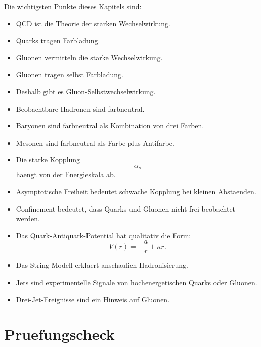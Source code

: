 \begin{notebox}
Die wichtigsten Punkte dieses Kapitels sind:
\begin{itemize}
    \item QCD ist die Theorie der starken Wechselwirkung.
    \item Quarks tragen Farbladung.
    \item Gluonen vermitteln die starke Wechselwirkung.
    \item Gluonen tragen selbst Farbladung.
    \item Deshalb gibt es Gluon-Selbstwechselwirkung.
    \item Beobachtbare Hadronen sind farbneutral.
    \item Baryonen sind farbneutral als Kombination von drei Farben.
    \item Mesonen sind farbneutral als Farbe plus Antifarbe.
    \item Die starke Kopplung
    \[
        \alpha_s
    \]
    haengt von der Energieskala ab.
    \item Asymptotische Freiheit bedeutet schwache Kopplung bei kleinen Abstaenden.
    \item Confinement bedeutet, dass Quarks und Gluonen nicht frei beobachtet werden.
    \item Das Quark-Antiquark-Potential hat qualitativ die Form:
    \[
        V(r)=-\frac{a}{r}+\kappa r.
    \]
    \item Das String-Modell erklaert anschaulich Hadronisierung.
    \item Jets sind experimentelle Signale von hochenergetischen Quarks oder Gluonen.
    \item Drei-Jet-Ereignisse sind ein Hinweis auf Gluonen.
\end{itemize}
\end{notebox}

\section{Pruefungscheck}

